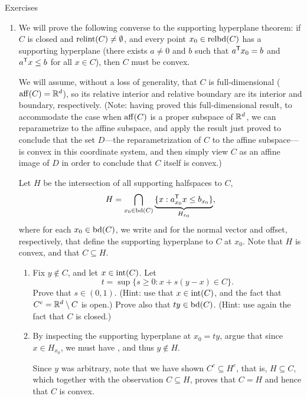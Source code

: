 \begin{xcb}{Exercises}
\begin{enumerate}[label=\thechapter.\arabic*]
\settowidth{\leftmargini}{0.00.\hskip\labelsep}
\item \label{ex:converse_supporting_hyperplane}
  We will prove the following converse to the supporting hyperplane theorem: if
  $C$ is closed and $\operatorname{relint}(C) \not= \emptyset$, and every point $x_0 \in
  \operatorname{relbd}(C)$ has a supporting hyperplane (there exists $a\not=0$ and $b$ such
  that $a^{\mathsf{T}} x_0 = b$ and $a^{\mathsf{T}} x \leq b$ for all $x \in C$), then $C$ must be 
  convex. 

  We will assume, without a loss of generality, that $C$ is full-dimensional
  ($\operatorname{aff}(C) = \mathbb{R}^d$), so its relative interior and relative boundary are its
  interior and boundary, respectively. (Note: having proved this
  full-dimensional result, to accommodate the case when $\operatorname{aff}(C)$ is a proper
  subspace of $\mathbb{R}^d$, we can reparametrize to the affine subspace, and apply the
  result just proved to conclude that the set $D$---the reparametrization of $C$
  to the affine subspace---is convex in this coordinate system, and then simply
  view $C$ as an affine image of $D$ in order to conclude that $C$ itself is
  convex.)  

  Let $H$ be the intersection of all supporting halfspaces to $C$, 
  \[
  H = \bigcap_{x_0 \in \operatorname{bd}(C)} \underbrace{\{ x :  a_{x_0}^{\mathsf{T}} x \leq
    b_{x_0} \}}_{H_{x_0}}, 
  \]
  where for each $x_0 \in \operatorname{bd}(C)$, we write  and
   for the normal vector and offset, respectively, that define
  the supporting hyperplane to $C$ at $x_0$. Note that $H$ is convex, and that
  $C \subseteq H$.    

\begin{enumerate}[label=\alph*.]
\item Fix $y \notin C$, and let $x \in \operatorname{int}(C)$. Let
  \[
  t = \sup \{ s \geq 0 : x + s (y - x) \in C \}. 
  \]
  Prove that $s \in (0,1)$. (Hint: use that $x \in \operatorname{int}(C)$, and the fact
  that $C^c = \mathbb{R}^d \setminus C$ is open.) Prove also that $t y \in
  \operatorname{bd}(C)$. (Hint: use again the fact that $C$ is closed.) 

\item By inspecting the supporting hyperplane at $x_0 = t y$, argue that since
  $x \in H_{x_0}$, we must have , and thus $y \notin 
  H$. 

  \smallskip
  Since $y$ was arbitrary, note that we have shown $C^c \subseteq H^c$, that is,
  $H \subseteq C$, which together with the observation $C \subseteq H$, proves
  that $C = H$ and hence that $C$ is convex. 
\end{enumerate}


\end{enumerate}
\end{xcb}
